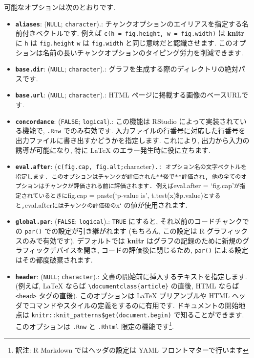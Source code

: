 \documentclass[
  11pt,
  lualatex,ja=standard,jafont=noto]{bxjsreport}
\providecommand{\tightlist}{%
  \setlength{\itemsep}{0pt}\setlength{\parskip}{0pt}}
\begin{document}
可能なオプションは次のとおりです.

\begin{itemize}
\tightlist
\item
  \textbf{\texttt{aliases}}: (\texttt{NULL}; \texttt{character}).: チャンクオプションのエイリアスを指定する名前付きベクトルです. 例えば \texttt{c(h = \textquotesingle{}fig.height\textquotesingle{},\ w\ =\ \textquotesingle{}fig.width\textquotesingle{})} は \textbf{knitr} に \texttt{h} は \texttt{fig.height} \texttt{w} は \texttt{fig.width} と同じ意味だと認識させます. このオプションは名前の長いチャンクオプションのタイピング労力を削減できます.
\item
  \textbf{\texttt{base.dir}}: (\texttt{NULL}; \texttt{character}).: グラフを生成する際のディレクトリの絶対パスです.
\item
  \textbf{\texttt{base.url}}: (\texttt{NULL}; \texttt{character}).: HTML ページに掲載する画像のベースURLです.
\item
  \textbf{\texttt{concordance}}: (\texttt{FALSE}; \texttt{logical}).: この機能は RStudio によって実装されている機能で, \texttt{.Rnw} でのみ有効です. 入力ファイルの行番号に対応した行番号を出力ファイルに書き出すかどうかを指定します. これにより, 出力から入力の誘導が可能になり, 特に LaTeX のエラー発生時に役に立ちます.
\item
  \textbf{\texttt{eval.after}}: (\texttt{c(\textquotesingle{}fig.cap\textquotesingle{},\ \textquotesingle{}fig.alt\textquotesingle{};}character\texttt{).: オプション名の文字ベクトルを指定します. このオプションはチャンクが評価された**後で**評価され, 他の全てのオプションはチャンクが評価される前に評価されます. 例えば}eval.after = `fig.cap'\texttt{が指定されているときに}fig.cap = paste(`p-value is', t.test(x)\$p.value)\texttt{とすると,}eval.after\texttt{にはチャンクの評価後の}x` の値が使用されます.
\item
  \textbf{\texttt{global.par}}: (\texttt{FALSE}; \texttt{logical}).: \texttt{TRUE} にすると, それ以前のコードチャンクでの \texttt{par()} での設定が引き継がれます (もちろん, この設定は R グラフィックスのみで有効です). デフォルトでは \textbf{knitr} はグラフの記録のために新規のグラフィックデバイスを開き, コードの評価後に閉じるため, \texttt{par()} による設定はその都度破棄されます.
\item
  \textbf{\texttt{header}}: (\texttt{NULL}; \texttt{character}).: 文書の開始前に挿入するテキストを指定します. (例えば, LaTeX ならば \texttt{\textbackslash{}documentclass\{article\}} の直後, HTML ならば \texttt{\textless{}head\textgreater{}} タグの直後). このオプションは LaTeX プリアンブルや HTML ヘッダでコマンドやスタイルの定義をするのに有用です. ドキュメントの開始地点は \texttt{knitr::knit\_patterns\$get(\textquotesingle{}document.begin\textquotesingle{})} で知ることができます. このオプションは \texttt{.Rnw} と \texttt{.Rhtml} 限定の機能です\footnote{訳注: R Markdown ではヘッダの設定は YAML フロントマターで行います}.

\end{itemize}
\end{document}
